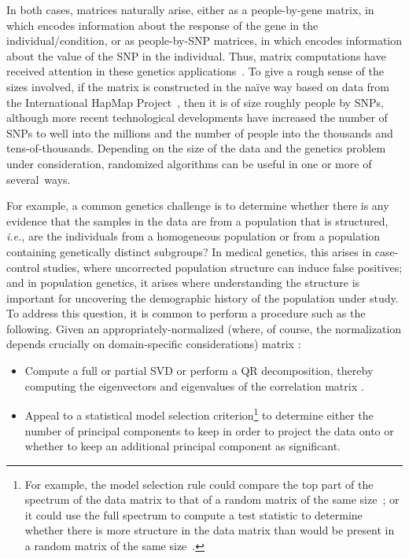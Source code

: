 \documentclass[twoside]{article}
\begin{document}
In both cases,  matrices  naturally arise, either as a
people-by-gene matrix, in which  encodes information about the 
response of the  gene in the  individual/condition, or as 
people-by-SNP matrices, in which  encodes information about the 
value of the  SNP in the  individual.
Thus, matrix computations have received attention in these genetics
applications~\cite{Alter_SVD_00,KPS02,Meng03,Horne04,LA04,PPR06}.
To give a rough sense of the sizes involved, if the matrix is constructed in 
the na\"{i}ve way based on data from the International HapMap 
Project~\cite{IHMC03,IHMC05}, then it is of size roughly  people by 
 SNPs, although more recent technological developments have 
increased the number of SNPs to well into the millions and the number of people 
into the thousands and tens-of-thousands.
Depending on the size of the data and the genetics problem under 
consideration, randomized algorithms can be useful in one or more of 
several~ways.

For example, a common genetics challenge is to determine whether there is 
any evidence that the samples in the data are from a population that is 
structured, \emph{i.e.}, are the individuals from a homogeneous population 
or from a population containing genetically distinct subgroups?
In medical genetics, this arises in case-control studies, where uncorrected 
population structure can induce false positives; and in population genetics, 
it arises where understanding the structure is important for uncovering the
demographic history of the population under study.
To address this question, it is common to perform a procedure such as the 
following.
Given an appropriately-normalized (where, of course, the normalization depends crucially on domain-specific considerations)  matrix :
\begin{itemize}
\item
Compute a full or partial SVD or perform a QR decomposition, thereby 
computing the eigenvectors and eigenvalues of the correlation matrix .
\item
Appeal to a statistical model selection criterion\footnote{For example, the model selection rule could compare the top part 
of the spectrum of the data matrix to that of a random matrix of the same 
size~\cite{Paschou07b,FK81}; 
or it could use the full spectrum to compute a test statistic to determine
whether there is more structure in the data matrix than would be present in 
a random matrix of the same size~\cite{PPR06,Joh01}.}
to determine either the number  of principal components to keep in order 
to project the data onto or whether to keep an additional principal 
component as significant.
\end{itemize}
\end{document}
